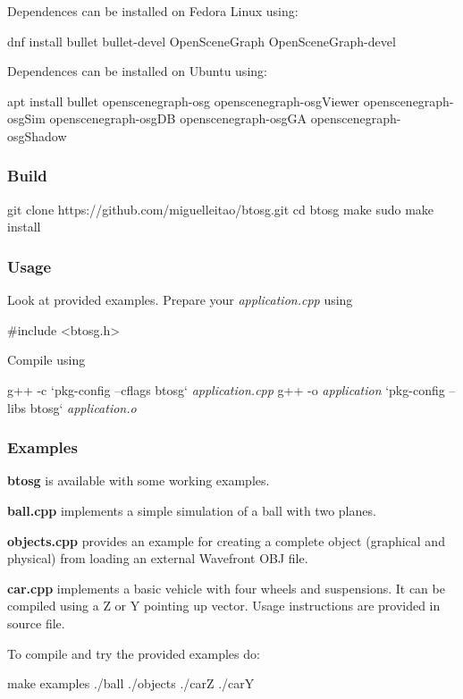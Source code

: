 Dependences can be installed on Fedora Linux using\+: \begin{DoxyVerb}dnf install bullet bullet-devel OpenSceneGraph OpenSceneGraph-devel
\end{DoxyVerb}


Dependences can be installed on Ubuntu using\+: \begin{DoxyVerb}apt install bullet openscenegraph-osg openscenegraph-osgViewer openscenegraph-osgSim openscenegraph-osgDB openscenegraph-osgGA openscenegraph-osgShadow
\end{DoxyVerb}


\subsubsection*{Build}

\begin{DoxyVerb}git clone https://github.com/miguelleitao/btosg.git
cd btosg
make
sudo make install
\end{DoxyVerb}


\subsubsection*{Usage}

Look at provided examples. Prepare your {\itshape application.\+cpp} using \begin{DoxyVerb}#include <btosg.h>
\end{DoxyVerb}


Compile using 
\begin{DoxyPre}
g++ -c `pkg-config --cflags btosg` {\itshape application.cpp}
g++ -o {\itshape application} `pkg-config --libs btosg` {\itshape application.o}
\end{DoxyPre}
 \subsubsection*{Examples}

{\bfseries{btosg}} is available with some working examples.
\begin{DoxyItemize}
\item {\bfseries{ball.\+cpp}} implements a simple simulation of a ball with two planes.
\item {\bfseries{objects.\+cpp}} provides an example for creating a complete object (graphical and physical) from loading an external Wavefront O\+BJ file.
\item {\bfseries{car.\+cpp}} implements a basic vehicle with four wheels and suspensions. It can be compiled using a Z or Y pointing up vector. Usage instructions are provided in source file.
\end{DoxyItemize}

To compile and try the provided examples do\+: \begin{DoxyVerb}make examples
./ball
./objects
./carZ
./carY
\end{DoxyVerb}
 